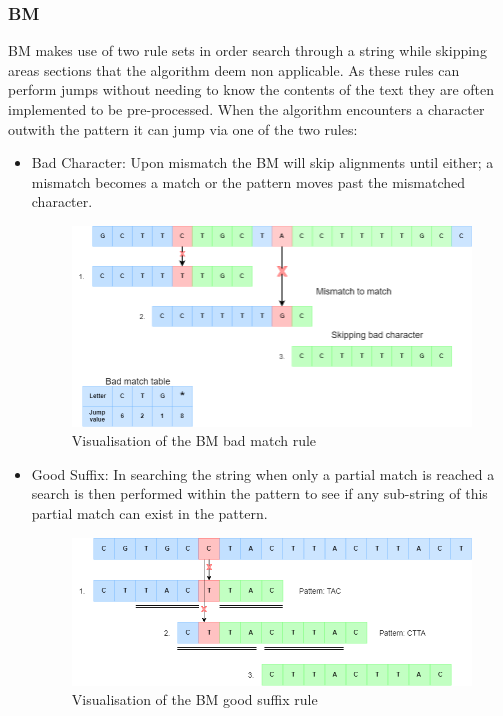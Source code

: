 \subsubsection*{\acl{BM}}
\acf{BM} makes use of two rule sets in order search through a string while skipping areas sections that the algorithm deem non applicable.
As these rules can perform jumps without needing to know the contents of the text they are often implemented to be pre-processed.
When the algorithm encounters a character outwith the pattern it can jump via one of the two rules:
\begin{itemize}
    \item Bad Character: Upon mismatch the BM will skip alignments until either; a mismatch becomes a match or the pattern moves past the mismatched character.
\begin{figure}[!ht]
    \centering
    \includegraphics[width=\linewidth]{Images/BMBadMatch.png}
    \caption{Visualisation of the \acl{BM} bad match rule}
    \label{fig:BM_BadMatch}
\end{figure}
\newpage    
    \item Good Suffix: In searching the string when only a partial match is reached a search is then performed within the pattern to see if any sub-string of this partial match can exist in the pattern. 
\begin{figure}[!ht]
    \centering
    \includegraphics[width=\linewidth]{Images/BMGoodSuffix.png}
    \caption{Visualisation of the \acl{BM} good suffix rule}
    \label{fig:BM_GoodSuffix}
\end{figure}
\end{itemize}


